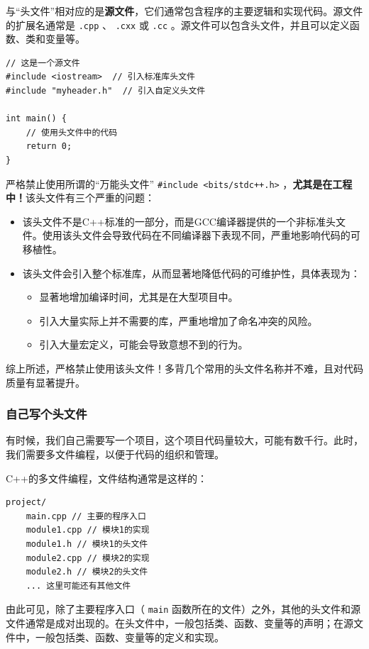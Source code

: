 与“头文件”相对应的是\textbf{源文件}，它们通常包含程序的主要逻辑和实现代码。源文件的扩展名通常是 \texttt{.cpp} 、 \texttt{.cxx} 或 \texttt{.cc} 。源文件可以包含头文件，并且可以定义函数、类和变量等。

\begin{verbatim}
// 这是一个源文件
#include <iostream>  // 引入标准库头文件
#include "myheader.h"  // 引入自定义头文件

int main() {
    // 使用头文件中的代码
    return 0;
}
\end{verbatim}

\begin{warning}
  严格禁止使用所谓的“万能头文件” \texttt{\#include <bits/stdc++.h>} ，\textbf{尤其是在工程中！}该头文件有三个严重的问题：
  \begin{itemize}
    \item 该头文件不是C++标准的一部分，而是GCC编译器提供的一个非标准头文件。使用该头文件会导致代码在不同编译器下表现不同，严重地影响代码的可移植性。
    \item 该头文件会引入整个标准库，从而显著地降低代码的可维护性，具体表现为：
      \begin{itemize}
        \item 显著地增加编译时间，尤其是在大型项目中。
        \item 引入大量实际上并不需要的库，严重地增加了命名冲突的风险。
        \item 引入大量宏定义，可能会导致意想不到的行为。
      \end{itemize}
  \end{itemize}
  综上所述，严格禁止使用该头文件！多背几个常用的头文件名称并不难，且对代码质量有显著提升。
\end{warning}

\subsubsection{自己写个头文件}

有时候，我们自己需要写一个项目，这个项目代码量较大，可能有数千行。此时，我们需要多文件编程，以便于代码的组织和管理。

C++的多文件编程，文件结构通常是这样的：
\begin{verbatim}
project/
    main.cpp // 主要的程序入口
    module1.cpp // 模块1的实现
    module1.h // 模块1的头文件
    module2.cpp // 模块2的实现
    module2.h // 模块2的头文件
    ... 这里可能还有其他文件
\end{verbatim}
由此可见，除了主要程序入口（ \texttt{main} 函数所在的文件）之外，其他的头文件和源文件通常是成对出现的。在头文件中，一般包括类、函数、变量等的声明；在源文件中，一般包括类、函数、变量等的定义和实现。

